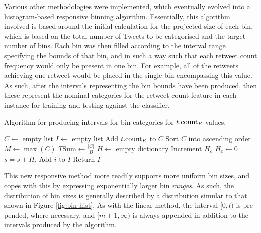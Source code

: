 \begin{enumerate}
Various other methodologies were implemented, which eventually evolved into a histogram-based responsive  binning algorithm. Essentially, this algorithm involved is based around the initial calculation for the projected size of each bin, which is based on the total number of Tweets to be categorised and the target number of bins. Each bin was then filled according to the interval range specifying the bounds of that bin, and in such a way such that each retweet count frequency would only be present in one bin. For example, all of the retweets achieving one retweet would be placed in the single bin encompassing this value.\\
As such, after the intervals representing the bin bounds have been produced, then these represent the nominal categories for the retweet count feature in each instance for training and testing against the classifier.



\begin{algorithm}
\caption{Algorithm for producing intervals for bin categories for $t.\textrm{count}_R$ values.}
\begin{algorithmic}[1]
    \State $C\gets$ empty list 
    \State $I\gets$ empty list 
        \State Add $t.\textrm{count}_R$ to $C$
    \EndFor
    \State Sort $C$ into ascending order 
    \State $M\gets\max(C)$ 
    \State $T\textrm{Sum}\gets\frac{|C|}{B}$ 
    \State $H\gets$ empty dictionary 
    \Statex
            \State Increment $H_c$
        \Else
            \State $H_c\gets0$
        \EndIf
    \EndFor
            \State $s = s + H_i$
        \EndIf
            \State Add $i$ to $I$
        \EndIf
    \EndFor
    \State Return $I$
\EndProcedure
\end{algorithmic}
\label{algo2}
\end{algorithm}
 
This new responsive method more readily supports more uniform bin sizes, and copes with this by expressing exponentially larger bin \textit{ranges}. As such, the distribution of bin sizes is generally described by a distribution simular to that shown in Figure \ref{fig:bin-hist}. As with the linear method, the interval $[0,l)$ is pre-pended, where necessary, and $[m+1,\infty)$ is always appended in addition to the intervals produced by the algorithm.


\end{enumerate}
